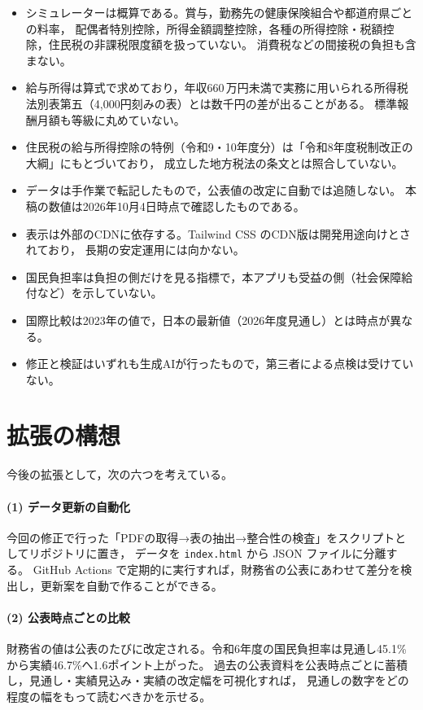 \documentclass[paper=a4,fontsize=10pt]{jlreq}
\newcommand{\code}[1]{\texttt{#1}}
\newcommand{\man}{\,万円}
\begin{document}
\begin{itemize}
  \item シミュレーターは概算である。賞与，勤務先の健康保険組合や都道府県ごとの料率，
    配偶者特別控除，所得金額調整控除，各種の所得控除・税額控除，住民税の非課税限度額を扱っていない。
    消費税などの間接税の負担も含まない。
  \item 給与所得は算式で求めており，年収660\man 未満で実務に用いられる所得税法別表第五（4,000円刻みの表）とは数千円の差が出ることがある。
    標準報酬月額も等級に丸めていない。
  \item 住民税の給与所得控除の特例（令和9・10年度分）は「令和8年度税制改正の大綱」にもとづいており，
    成立した地方税法の条文とは照合していない。
  \item データは手作業で転記したもので，公表値の改定に自動では追随しない。
    本稿の数値は2026年10月4日時点で確認したものである。
  \item 表示は外部のCDNに依存する。Tailwind CSS のCDN版は開発用途向けとされており\cite{tailwind}，
    長期の安定運用には向かない。
  \item 国民負担率は負担の側だけを見る指標で，本アプリも受益の側（社会保障給付など）を示していない。
  \item 国際比較は2023年の値で，日本の最新値（2026年度見通し）とは時点が異なる。
  \item 修正と検証はいずれも生成AIが行ったもので，第三者による点検は受けていない。
\end{itemize}

\section{拡張の構想}\label{sec:extension}

今後の拡張として，次の六つを考えている。

\paragraph{(1) データ更新の自動化}
今回の修正で行った「PDFの取得→表の抽出→整合性の検査」をスクリプトとしてリポジトリに置き，
データを \code{index.html} から JSON ファイルに分離する。
GitHub Actions で定期的に実行すれば，財務省の公表にあわせて差分を検出し，更新案を自動で作ることができる。

\paragraph{(2) 公表時点ごとの比較}
財務省の値は公表のたびに改定される。令和6年度の国民負担率は見通し45.1\%から実績46.7\%へ1.6ポイント上がった。
過去の公表資料を公表時点ごとに蓄積し，見通し・実績見込み・実績の改定幅を可視化すれば，
見通しの数字をどの程度の幅をもって読むべきかを示せる。
\end{document}
